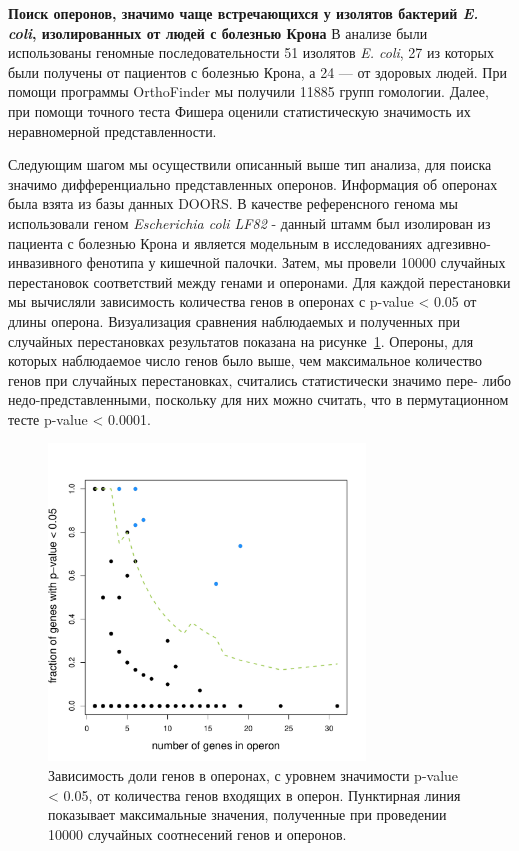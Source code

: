 \textbf{Поиск оперонов, значимо чаще встречающихся у изолятов бактерий \textit{E. coli}, изолированных от людей с болезнью Крона}
В анализе были использованы геномные последовательности 51 изолятов \textit{E. coli}, 27 из которых были получены от пациентов с болезнью Крона, а 24 --- от здоровых людей. При помощи программы OrthoFinder мы получили 11885 групп гомологии. Далее, при помощи точного теста Фишера оценили статистическую значимость их неравномерной представленности.  

Следующим шагом мы осуществили описанный выше тип анализа, для поиска значимо дифференциально представленных оперонов. Информация об оперонах была взята из базы данных DOORS. В качестве референсного генома мы использовали геном \textit{Escherichia coli LF82} - данный штамм был изолирован из пациента с болезнью Крона и является модельным в исследованиях адгезивно-инвазивного фенотипа у кишечной палочки. Затем, мы провели 10000 случайных перестановок соответствий между генами и оперонами. Для каждой перестановки мы вычисляли зависимость количества генов в оперонах с p-value < 0.05 от длины оперона. Визуализация сравнения наблюдаемых и полученных при случайных перестановках результатов показана на рисунке~\ref{img:operons_shuffle}. Опероны, для которых наблюдаемое число генов было выше, чем максимальное количество генов при случайных перестановках, считались статистически значимо пере- либо недо-представленными, поскольку для них можно считать, что в пермутационном тесте p-value < 0.0001. 

\begin{figure}[!ht] 
  \center
    \includegraphics [width=0.75\textwidth] {Dissertation/images/operons/statsignificant_operons.pdf}
    \caption{Зависимость доли генов в оперонах, с уровнем значимости p-value < 0.05, от количества генов входящих в оперон. Пунктирная линия показывает максимальные значения, полученные при проведении 10000 случайных соотнесений генов и оперонов.}
    \label{img:operons_shuffle}
\end{figure}

